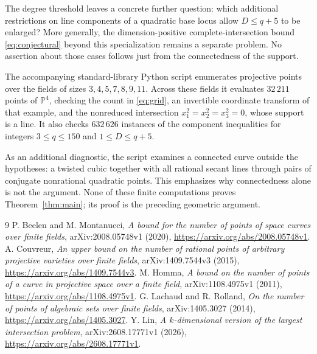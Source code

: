 \documentclass[11pt]{article}
\theoremstyle{remark}\newtheorem{remark}[theorem]{Remark}
\newcommand{\PP}{\mathbb P}
\begin{document}
The degree threshold leaves a concrete further question: which additional restrictions on line components of a quadratic base locus allow $D\le q+5$ to be enlarged? More generally, the dimension-positive complete-intersection bound \eqref{eq:conjectural} beyond this specialization remains a separate problem. No assertion about those cases follows just from the connectedness of the support.

The accompanying standard-library Python script enumerates projective points over the fields of sizes $3,4,5,7,8,9,11$. Across these fields it evaluates $32\,211$ points of $\PP^4$, checking the count in \eqref{eq:grid}, an invertible coordinate transform of that example, and the nonreduced intersection $x_1^2=x_2^2=x_3^2=0$, whose support is a line. It also checks $632\,626$ instances of the component inequalities for integers $3\le q\le150$ and $1\le D\le q+5$.

As an additional diagnostic, the script examines a connected curve outside the hypotheses: a twisted cubic together with all rational secant lines through pairs of conjugate nonrational quadratic points. This emphasizes why connectedness alone is not the argument. None of these finite computations proves Theorem~\ref{thm:main}; its proof is the preceding geometric argument.

\begin{thebibliography}{9}
 P. Beelen and M. Montanucci, \emph{A bound for the number of points of space curves over finite fields}, arXiv:2008.05748v1 (2020), \url{https://arxiv.org/abs/2008.05748v1}.
 A. Couvreur, \emph{An upper bound on the number of rational points of arbitrary projective varieties over finite fields}, arXiv:1409.7544v3 (2015), \url{https://arxiv.org/abs/1409.7544v3}.
 M. Homma, \emph{A bound on the number of points of a curve in projective space over a finite field}, arXiv:1108.4975v1 (2011), \url{https://arxiv.org/abs/1108.4975v1}.
 G. Lachaud and R. Rolland, \emph{On the number of points of algebraic sets over finite fields}, arXiv:1405.3027 (2014), \url{https://arxiv.org/abs/1405.3027}.
 Y. Lin, \emph{A $k$-dimensional version of the largest intersection problem}, arXiv:2608.17771v1 (2026), \url{https://arxiv.org/abs/2608.17771v1}.
\end{thebibliography}
\end{document}
